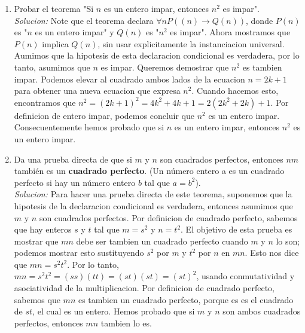 \documentclass[]{article}
\begin{document}
\begin{enumerate}
	\item Probar el teorema "Si $n$ es un entero impar, entonces $n^{2}$ es impar".\\
	\textit{Solucion:} Note que el teorema declara $\forall nP((n) \rightarrow Q(n))$, donde $P(n)$ es "$n$ es un entero impar" y $Q(n)$ es "$n^{2}$ es impar". Ahora mostramos que $P(n)$ implica $Q(n)$, sin usar explicitamente la instanciacion universal. Aumimos que la hipotesis de esta declaracion condicional es verdadera, por lo tanto, asumimos que $n$ es impar. Queremos demostrar que $n^{2}$ es tambien impar. Podemos elevar al cuadrado ambos lados de la ecuacion $n = 2k + 1$ para obtener una nueva ecuacion que expresa $n^{2}$. Cuando hacemos esto, encontramos que $n^{2} = (2k + 1)^{2} = 4k^{2} + 4k + 1 = 2 (2k^{2} + 2k) + 1$. Por definicion de entero impar, podemos concluir que $n^{2}$ es un entero impar. Consecuentemente hemos probado que si $n$ es un entero impar, entonces $n^{2}$ es un entero impar.

	\item  Da una prueba directa de que si $m$ y $n$ son cuadrados perfectos, entonces $nm$ también es un \textbf{cuadrado perfecto}. (Un número entero a es un cuadrado perfecto si hay un número entero $b$ tal que $a = b^{2}$).\\
	\textit{Solucion:} Para hacer una prueba directa de este teorema, suponemos que la hipotesis de la declaracion condicional es verdadera, entonces asumimos que $m$ y $n$ son cuadrados perfectos. Por definicion de cuadrado perfecto, sabemos que hay enteros $s$ y $t$ tal que $m = s^{2}$ y $n = t^{2}$. El objetivo de esta prueba es mostrar que $mn$ debe ser tambien un cuadrado perfecto cuando $m$ y $n$ lo son; podemos mostrar esto sustituyendo $s^{2}$ por $m$ y $t^{2}$ por $n$ en $mn$. Esto nos dice que $mn = s^{2}t^{2}$. Por lo tanto, $mn = s^{2}t^{2} = (ss)(tt) = (st)(st) = (st)^{2}$, usando conmutatividad y asociatividad de la multiplicacion. Por definicion de cuadrado perfecto, sabemos que $mn$ es tambien un cuadrado perfecto, porque es es el cuadrado de $st$, el cual es un entero. Hemos probado que si $m$ y $n$ son ambos cuadrados perfectos, entonces $mn$ tambien lo es.
\end{enumerate}
\end{document}
